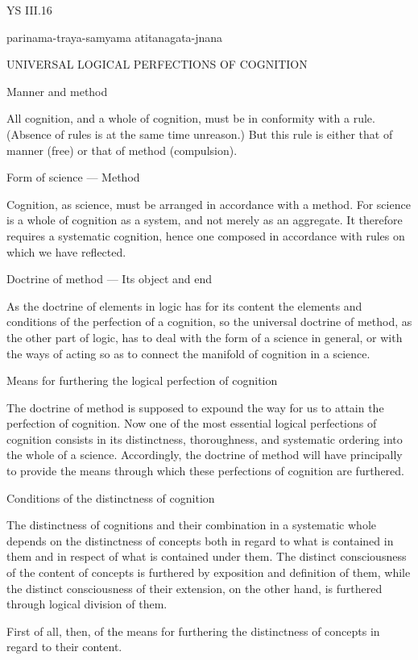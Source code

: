 YS III.16

    parinama-traya-samyama atitanagata-jnana

    UNIVERSAL LOGICAL PERFECTIONS OF COGNITION

    Manner and method

    All cognition, and a whole of cognition,
    must be in conformity with a rule.
    (Absence of rules is at the same time unreason.)
    But this rule is either that of manner (free)
    or that of method (compulsion).

    Form of science — Method

    Cognition, as science, must be arranged
    in accordance with a method.
    For science is a whole of cognition as a system,
    and not merely as an aggregate.
    It therefore requires a systematic cognition,
    hence one composed in accordance with rules
    on which we have reflected.

    Doctrine of method — Its object and end

    As the doctrine of elements in logic has for its content
    the elements and conditions of the perfection of a cognition,
    so the universal doctrine of method, as the other part of logic,
    has to deal with the form of a science in general,
    or with the ways of acting so as to connect
    the manifold of cognition in a science.

    Means for furthering the logical perfection of cognition

    The doctrine of method is supposed to expound the way for us
    to attain the perfection of cognition.
    Now one of the most essential logical perfections of cognition
    consists in its distinctness, thoroughness, and systematic ordering
    into the whole of a science.
    Accordingly, the doctrine of method will have principally to provide
    the means through which these perfections of cognition are furthered.

    Conditions of the distinctness of cognition

    The distinctness of cognitions and their combination
    in a systematic whole depends on the distinctness of concepts
    both in regard to what is contained in them
    and in respect of what is contained under them.
    The distinct consciousness of the content of concepts is furthered
    by exposition and definition of them,
    while the distinct consciousness of their extension, on the other hand,
    is furthered through logical division of them.

    First of all, then, of the means for furthering
    the distinctness of concepts in regard to their content.

